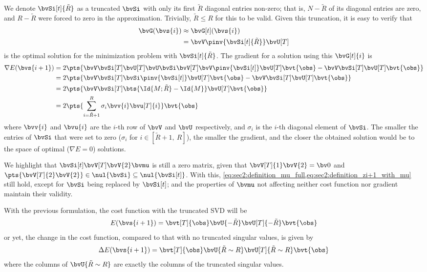 {We denote $\bvSi[t]{\tilde{R}}$ as a truncated $\bvSi$ with only its first $\tilde{R}$ diagonal entries non-zero; that is, $N-\tilde{R}$ of its diagonal entries are zero, and $R-\tilde{R}$ were forced to zero in the approximation. Trivially, $\tilde{R} \leq R$ for this to be valid. Given this truncation, it is easy to verify that
\begin{equation}
	\begin{split}
		\bvG(\bvs{i}) & \approx \bvG[t](\bvs{i}) \\
		& = \bvV \pinv{\bvSi[t]{\tilde{R}}} \bvU[T]
	\end{split}
\end{equation}
is the optimal solution for the minimization problem with $\bvSi[t]{\tilde{R}}$. The gradient for a solution using this $\bvG[t]{i}$ is
\begin{equation}
	\begin{split}
		\nabla E(\bvs{i+1})
		& = 2\pts{\bvV \bvSi[T] \bvU[T] \bvU \bvSi \bvV[T] \bvV \pinv{\bvSi[t]} \bvU[T] \bvt{\obs} - \bvV \bvSi[T] \bvU[T] \bvt{\obs}} \\
		& = 2\pts{\bvV \bvSi[T] \bvSi \pinv{\bvSi[t]} \bvU[T] \bvt{\obs} - \bvV \bvSi[T] \bvU[T] \bvt{\obs}} \\
		& = 2\pts{\bvV \bvSi[T] \bts{\Id{M;\tilde{R}} - \Id{M}} \bvU[T] \bvt{\obs}} \\
		& = 2\pts{\sum_{i=\tilde{R}+1}^{R} \sigma_i \bvv{i} \bvu[T]{i}} \bvt{\obs}
	\end{split}
\end{equation}
where $\bvv{i}$ and $\bvu{i}$ are the $i$-th row of $\bvV$ and $\bvU$ respectively, and $\sigma_i$ is the $i$-th diagonal element of $\bvSi$. The smaller the entries of $\bvSi$ that were set to zero ($\sigma_i$ for $i \in [\tilde{R}+1,~R]$), the smaller the gradient, and the closer the obtained solution would be to the space of optimal ($\nabla E = 0$) solutions.

We highlight that $\bvSi[t] \bvV[T] \bvV{2} \bvmu$ is still a zero matrix, given that $\bvV[T]{1} \bvV{2} = \bv0$ and $\pts{\bvV[T]{2} \bvV{2}} \in \nul{\bvSi} \subseteq \nul{\bvSi[t]}$. With this, \cref{eq:sec2:definition_mu_full,eq:sec2:definition_zi+1_with_mu} still hold, except for ${\bvSi}$ being replaced by ${\bvSi[t]}$; and the properties of $\bvmu$ not affecting neither cost function nor gradient maintain their validity.

With the previous formulation, the cost function with the truncated SVD will be
\begin{equation}
	E(\bvs{i+1}) = \bvt[T]{\obs} \bvU{-\tilde{R}} \bvU[T]{-\tilde{R}} \bvt{\obs}
\end{equation}
or yet, the change in the cost function, compared to that with no truncated singular values, is given by
\begin{equation}
	\Delta E(\bvs{i+1}) = \bvt[T]{\obs}  \bvU{\tilde{R}\sim R} \bvU[T]{\tilde{R}\sim R} \bvt{\obs}
\end{equation}
where the columns of $\bvU{\tilde{R} \sim R}$ are exactly the columns of the truncated singular values.

}
